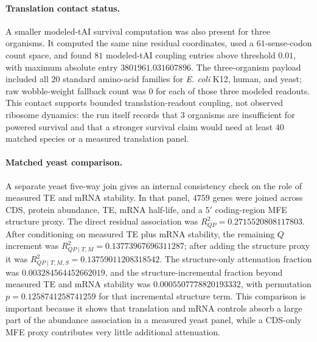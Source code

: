 \paragraph{Translation contact status.}
A smaller modeled-tAI survival computation was also present for three organisms.  It computed the same nine residual coordinates, used a $61$-sense-codon count space, and found $81$ modeled-tAI coupling entries above threshold $0.01$, with maximum absolute entry $3801961.031607896$.  The three-organism payload included all $20$ standard amino-acid families for \textit{E. coli} K12, human, and yeast; raw wobble-weight fallback count was $0$ for each of those three modeled readouts.  This contact supports bounded translation-readout coupling, not observed ribosome dynamics: the run itself records that $3$ organisms are insufficient for powered survival and that a stronger survival claim would need at least $40$ matched species or a measured translation panel.

\paragraph{Matched yeast comparison.}
A separate yeast five-way join gives an internal consistency check on the role of measured TE and mRNA stability.  In that panel, $4759$ genes were joined across CDS, protein abundance, TE, mRNA half-life, and a $5'$ coding-region MFE structure proxy.  The direct residual association was $R^2_{QP}=0.2715520808117803$.  After conditioning on measured TE plus mRNA stability, the remaining $Q$ increment was $R^2_{QP\mid T,M}=0.13773967696311287$; after adding the structure proxy it was $R^2_{QP\mid T,M,S}=0.13759011208318542$.  The structure-only attenuation fraction was $0.003284564452662019$, and the structure-incremental fraction beyond measured TE and mRNA stability was $0.0005507778820193332$, with permutation $p=0.1258741258741259$ for that incremental structure term.  This comparison is important because it shows that translation and mRNA controls absorb a large part of the abundance association in a measured yeast panel, while a CDS-only MFE proxy contributes very little additional attenuation.

